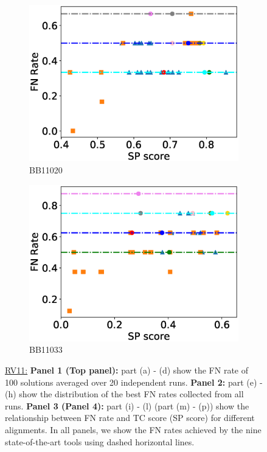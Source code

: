\begin{figure}[!htbp]
\begin{adjustwidth}{-1cm}{-1cm}
\begin{subfigure}{0.26\textwidth}
			\includegraphics[width=\columnwidth]{Figure/summary/precomputedInit/Balibase/BB11020_fnrate_vs_sp_2}
			\caption{BB11020}
		\end{subfigure}
		\begin{subfigure}{0.26\textwidth}
			\includegraphics[width=\columnwidth]{Figure/summary/precomputedInit/Balibase/BB11033_fnrate_vs_sp_2}
			\caption{BB11033}
		\end{subfigure}
	
	\caption{ \underline{RV11:} \textbf{Panel 1 (Top panel):} part (a) - (d) show the FN rate of 100 solutions averaged over 20 independent runs. 
	\textbf{Panel 2:} part (e) - (h) show the distribution of the best FN rates collected from all runs. 
	\textbf{Panel 3 (Panel 4):} part (i) - (l) (part (m) - (p)) show the relationship between FN rate and TC score (SP score) for different alignments. In all panels, we show the FN rates achieved by the nine state-of-the-art tools using dashed horizontal lines.}
	\label{fig:rv11_fn_rate_tc_sp}
\end{adjustwidth}
\end{figure}


